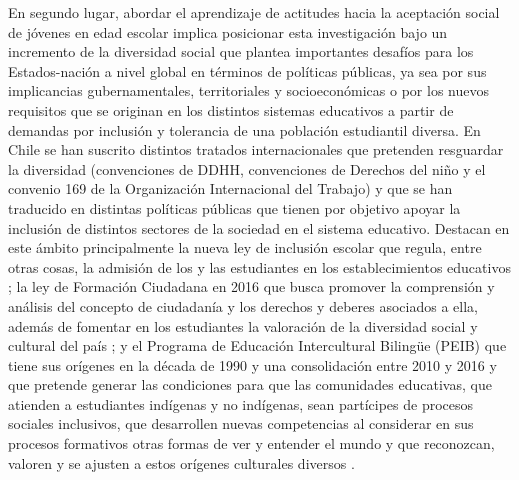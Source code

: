 \documentclass[12pt,twoside]{templates/facsothesis}
\begin{document}
En segundo lugar, abordar el aprendizaje de actitudes hacia la aceptación social de jóvenes en edad escolar implica posicionar esta investigación bajo un incremento de la diversidad social que plantea importantes desafíos para los Estados-nación a nivel global en términos de políticas públicas, ya sea por sus implicancias gubernamentales, territoriales y socioeconómicas o por los nuevos requisitos que se originan en los distintos sistemas educativos a partir de demandas por inclusión y tolerancia de una población estudiantil diversa. En Chile se han suscrito distintos tratados internacionales que pretenden resguardar la diversidad (convenciones de DDHH, convenciones de Derechos del niño y el convenio 169 de la Organización Internacional del Trabajo) y que se han traducido en distintas políticas públicas que tienen por objetivo apoyar la inclusión de distintos sectores de la sociedad en el sistema educativo. Destacan en este ámbito principalmente la nueva ley de inclusión escolar que regula, entre otras cosas, la admisión de los y las estudiantes en los establecimientos educativos \citep{bibliotecadelcongresonacional_ley_2015}; la ley de Formación Ciudadana en 2016 que busca promover la comprensión y análisis del concepto de ciudadanía y los derechos y deberes asociados a ella, además de fomentar en los estudiantes la valoración de la diversidad social y cultural del país \citep{bibliotecadelcongresonacional_plan_2016}; y el Programa de Educación Intercultural Bilingüe (PEIB) que tiene sus orígenes en la década de 1990 y una consolidación entre 2010 y 2016 y que pretende generar las condiciones para que las comunidades educativas, que atienden a estudiantes indígenas y no indígenas, sean partícipes de procesos sociales inclusivos, que desarrollen nuevas competencias al considerar en sus procesos formativos otras formas de ver y entender el mundo y que reconozcan, valoren y se ajusten a estos orígenes culturales diversos \citep{ministeriodeeducacion_Programa_2017}.
\end{document}
